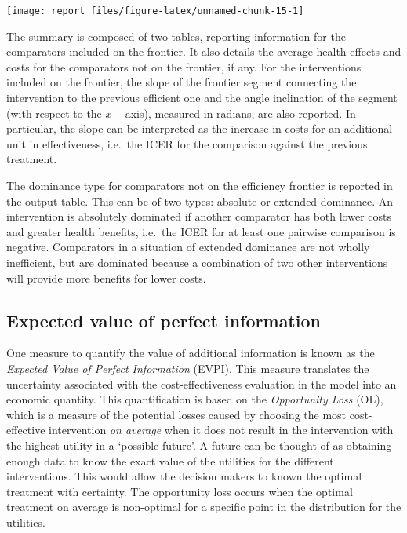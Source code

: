 \documentclass[
]{article}
\begin{document}
\begin{center}\texttt{[image: report\_files/figure-latex/unnamed-chunk-15-1]} \end{center}

The summary is composed of two tables, reporting information for the
comparators included on the frontier. It also details the average health
effects and costs for the comparators not on the frontier, if any. For
the interventions included on the frontier, the slope of the frontier
segment connecting the intervention to the previous efficient one and
the angle inclination of the segment (with respect to the \(x-\)axis),
measured in radians, are also reported. In particular, the slope can be
interpreted as the increase in costs for an additional unit in
effectiveness, i.e.~the ICER for the comparison against the previous
treatment.

The dominance type for comparators not on the efficiency frontier is
reported in the output table. This can be of two types: absolute or
extended dominance. An intervention is absolutely dominated if another
comparator has both lower costs and greater health benefits, i.e.~the
ICER for at least one pairwise comparison is negative. Comparators in a
situation of extended dominance are not wholly inefficient, but are
dominated because a combination of two other interventions will provide
more benefits for lower costs.

\hypertarget{expected-value-of-perfect-information}{%
\subsection{Expected value of perfect
information}\label{expected-value-of-perfect-information}}

One measure to quantify the value of additional information is known as
the \emph{Expected Value of Perfect Information} (EVPI). This measure
translates the uncertainty associated with the cost-effectiveness
evaluation in the model into an economic quantity. This quantification
is based on the \emph{Opportunity Loss} (OL), which is a measure of the
potential losses caused by choosing the most cost-effective intervention
\emph{on average} when it does not result in the intervention with the
highest utility in a `possible future'. A future can be thought of as
obtaining enough data to know the exact value of the utilities for the
different interventions. This would allow the decision makers to known
the optimal treatment with certainty. The opportunity loss occurs when
the optimal treatment on average is non-optimal for a specific point in
the distribution for the utilities.
\end{document}
